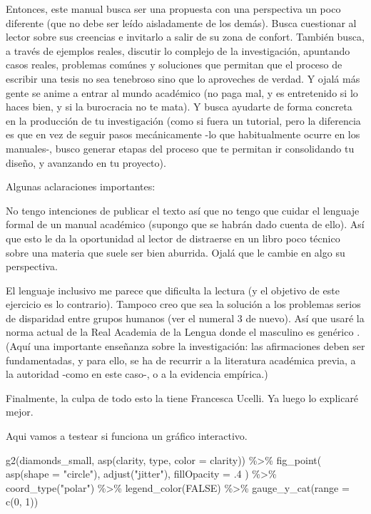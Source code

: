 \documentclass[
]{book}
\newenvironment{Shaded}{\begin{snugshade}}{\end{snugshade}}
\newcommand{\AttributeTok}[1]{\textcolor[rgb]{0.77,0.63,0.00}{#1}}
\newcommand{\ConstantTok}[1]{\textcolor[rgb]{0.00,0.00,0.00}{#1}}
\newcommand{\DecValTok}[1]{\textcolor[rgb]{0.00,0.00,0.81}{#1}}
\newcommand{\FunctionTok}[1]{\textcolor[rgb]{0.00,0.00,0.00}{#1}}
\newcommand{\NormalTok}[1]{#1}
\newcommand{\SpecialCharTok}[1]{\textcolor[rgb]{0.00,0.00,0.00}{#1}}
\newcommand{\StringTok}[1]{\textcolor[rgb]{0.31,0.60,0.02}{#1}}
\begin{document}
Entonces, este manual busca ser una propuesta con una perspectiva un poco diferente (que no debe ser leído aisladamente de los demás). Busca cuestionar al lector sobre sus creencias e invitarlo a salir de su zona de confort. También busca, a través de ejemplos reales, discutir lo complejo de la investigación, apuntando casos reales, problemas comúnes y soluciones que permitan que el proceso de escribir una tesis no sea tenebroso sino que lo aproveches de verdad. Y ojalá más gente se anime a entrar al mundo académico (no paga mal, y es entretenido si lo haces bien, y si la burocracia no te mata). Y busca ayudarte de forma concreta en la producción de tu investigación (como si fuera un tutorial, pero la diferencia es que en vez de seguir pasos mecánicamente -lo que habitualmente ocurre en los manuales-, busco generar etapas del proceso que te permitan ir consolidando tu diseño, y avanzando en tu proyecto).

Algunas aclaraciones importantes:

No tengo intenciones de publicar el texto así que no tengo que cuidar el lenguaje formal de un manual académico (supongo que se habrán dado cuenta de ello). Así que esto le da la oportunidad al lector de distraerse en un libro poco técnico sobre una materia que suele ser bien aburrida. Ojalá que le cambie en algo su perspectiva.

El lenguaje inclusivo me parece que dificulta la lectura (y el objetivo de este ejercicio es lo contrario). Tampoco creo que sea la solución a los problemas serios de disparidad entre grupos humanos (ver el numeral 3 de nuevo). Así que usaré la norma actual de la Real Academia de la Lengua donde el masculino es genérico \citep{rae}. (Aquí una importante enseñanza sobre la investigación: las afirmaciones deben ser fundamentadas, y para ello, se ha de recurrir a la literatura académica previa, a la autoridad -como en este caso-, o a la evidencia empírica.)

Finalmente, la culpa de todo esto la tiene Francesca Ucelli. Ya luego lo explicaré mejor.

Aqui vamos a testear si funciona un gráfico interactivo.

\begin{Shaded}
\begin{Highlighting}[]
\FunctionTok{g2}\NormalTok{(diamonds\_small, }\FunctionTok{asp}\NormalTok{(clarity, type, }\AttributeTok{color =}\NormalTok{ clarity)) }\SpecialCharTok{\%\textgreater{}\%} 
  \FunctionTok{fig\_point}\NormalTok{(}
    \FunctionTok{asp}\NormalTok{(}\AttributeTok{shape =} \StringTok{"circle"}\NormalTok{),}
    \FunctionTok{adjust}\NormalTok{(}\StringTok{"jitter"}\NormalTok{), }
    \AttributeTok{fillOpacity =}\NormalTok{ .}\DecValTok{4}
\NormalTok{  ) }\SpecialCharTok{\%\textgreater{}\%} 
  \FunctionTok{coord\_type}\NormalTok{(}\StringTok{"polar"}\NormalTok{) }\SpecialCharTok{\%\textgreater{}\%} 
  \FunctionTok{legend\_color}\NormalTok{(}\ConstantTok{FALSE}\NormalTok{) }\SpecialCharTok{\%\textgreater{}\%} 
  \FunctionTok{gauge\_y\_cat}\NormalTok{(}\AttributeTok{range =} \FunctionTok{c}\NormalTok{(}\DecValTok{0}\NormalTok{, }\DecValTok{1}\NormalTok{))}
\end{Highlighting}
\end{Shaded}
\end{document}
